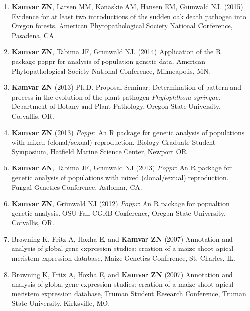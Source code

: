 \begin{enumerate}[leftmargin = 14pt]

	\item \textbf{Kamvar ZN}, Larsen MM, Kanaskie AM, Hansen EM, Gr\"unwald NJ.
	(2015) Evidence for at least two introductions of the sudden oak death
	pathogen into Oregon forests. American Phytopathological Society National
	Conference, Pasadena, CA.

	\vspace{6pt}

	\item \textbf{Kamvar ZN}, Tabima JF, Gr\"unwald NJ. (2014) Application of
	the R package poppr for analysis of population genetic data. American
	Phytopathological Society National Conference, Minneapolis, MN.

	\vspace{6pt}

	\item \textbf{Kamvar ZN} (2013) Ph.D. Proposal Seminar: Determination of
	pattern and process in the evolution of the plant pathogen
	\textit{Phytophthora syringae}. Department of Botany and Plant Pathology,
	Oregon State University, Corvallis, OR.

	\vspace{6pt}

	\item \textbf{Kamvar ZN} (2013) \textit{Poppr}: An R package for genetic
	analysis of populations with mixed (clonal/sexual) reproduction. Biology
	Graduate Student Symposium, Hatfield Marine Science Center, Newport OR.

	\vspace{6pt}

	\item \textbf{Kamvar ZN}, Tabima JF, Gr\"unwald NJ (2013) \textit{Poppr}: An
	R package for genetic analysis of populations with mixed (clonal/sexual)
	reproduction. Fungal Genetics Conference, Asilomar, CA.

	\vspace{6pt}

	\item \textbf{Kamvar ZN}, Gr\"unwald NJ (2012) \textit{Poppr}: An R package
	for popualtion genetic analysis. OSU Fall CGRB Conference, Oregon State
	University, Corvallis, OR.

	\vspace{6pt}

	\item Browning K, Fritz A, Hoxha E, and \textbf{Kamvar ZN} (2007) Annotation
	and analysis of global gene expression studies: creation of a maize shoot
	apical meristem expression database, Maize Genetics Conference, St. Charles,
	IL.

	\vspace{6pt}

	\item Browning K, Fritz A, Hoxha E, and \textbf{Kamvar ZN} (2007) Annotation
	and analysis of global gene expression studies: creation of a maize shoot
	apical meristem expression database, Truman Student Research Conference,
	Truman State University, Kirksville, MO.

\end{enumerate}

